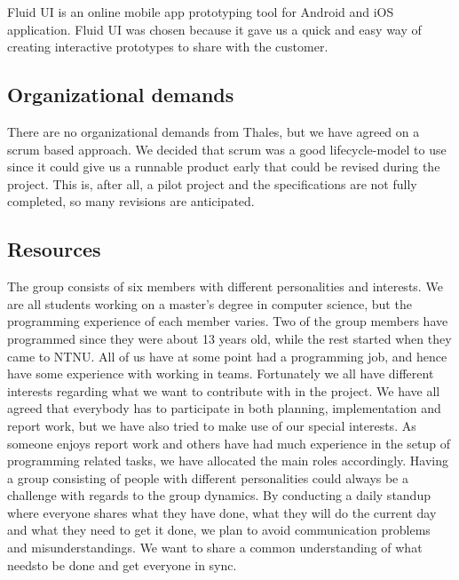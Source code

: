 Fluid UI \cite{bib:fui} is an online mobile app prototyping tool for Android and iOS application. Fluid UI was chosen because it gave us a quick and easy way of creating interactive prototypes to share with the customer.

\pagebreak

\subsection{Organizational demands}
There are no organizational demands from Thales, but we have agreed on a scrum based approach. We decided that scrum was a good lifecycle-model to use since it could give us a runnable product early that could be revised during the project. This is, after all, a pilot project and the specifications are not fully completed, so many revisions are anticipated.

\subsection{Resources}
The group consists of six members with different personalities and interests. We are all students working on a master's degree in computer science, but the programming experience of each member varies. Two of the group members have programmed since they were about 13 years old, while the rest started when they came to NTNU. All of us have at some point had a programming job, and hence have some experience with working in teams.
\newline
\newline
Fortunately we all have different interests regarding what we want to contribute with in the project. We have all agreed that everybody has to participate in both planning, implementation and report work, but we have also tried to make use of our special interests. As someone enjoys report work and others have had much experience in the setup of programming related tasks, we have allocated the main roles accordingly.
\newline
\newline
Having a group consisting of people with different personalities could always be a challenge with regards to the group dynamics. By conducting a daily standup where everyone shares what they have done, what they will do the current day and what they need to get it done, we plan to avoid communication problems and misunderstandings. We want to share a common understanding of what needsto be done and get everyone in sync. 

